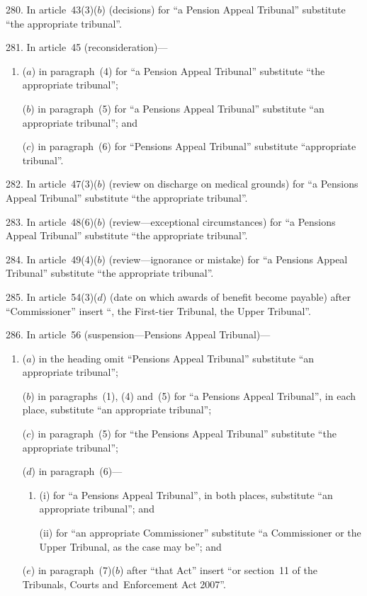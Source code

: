 \documentclass[12pt,a4paper]{article}
\begin{document}
\medskip

280.  In article~43(3)($b$)  (decisions) for “a Pension Appeal Tribunal” substitute “the appropriate tribunal”.

\medskip

281.  In article~45 (reconsideration)—
\begin{enumerate}\item[]
($a$) in paragraph~(4) for “a Pension Appeal Tribunal” substitute “the appropriate tribunal”;

($b$) in paragraph~(5) for “a Pensions Appeal Tribunal” substitute “an appropriate tribunal”; and

($c$) in paragraph~(6) for “Pensions Appeal Tribunal” substitute “appropriate tribunal”.
\end{enumerate}

\medskip

282.  In article~47(3)($b$)  (review on discharge on medical grounds) for “a Pensions Appeal Tribunal” substitute “the appropriate tribunal”.

\medskip

283.  In article~48(6)($b$)  (review---exceptional circumstances) for “a Pensions Appeal Tribunal” substitute “the appropriate tribunal”.

\medskip

284.  In article~49(4)($b$)  (review---ignorance or mistake) for “a Pensions Appeal Tribunal” substitute “the appropriate tribunal”.

\medskip

285.  In article~54(3)($d$)  (date on which awards of benefit become payable) after “Commissioner” insert “, the First-tier Tribunal, the Upper Tribunal”.

\medskip

286.  In article~56 (suspension---Pensions Appeal Tribunal)—
\begin{enumerate}\item[]
($a$) in the heading omit “Pensions Appeal Tribunal” substitute “an appropriate tribunal”;

($b$) in paragraphs~(1), (4) and~(5) for “a Pensions Appeal Tribunal”, in each place, substitute “an appropriate tribunal”;

($c$) in paragraph~(5) for “the Pensions Appeal Tribunal” substitute “the appropriate tribunal”;

($d$) in paragraph~(6)—
\begin{enumerate}\item[]
(i) for “a Pensions Appeal Tribunal”, in both places, substitute “an appropriate tribunal”; and

(ii) for “an appropriate Commissioner” substitute “a Commissioner or the Upper Tribunal, as the case may be”; and
\end{enumerate}

($e$) in paragraph~(7)($b$)  after “that Act” insert “or section~11 of the Tribunals, Courts and~Enforcement Act 2007”.
\end{enumerate}
\end{document}
